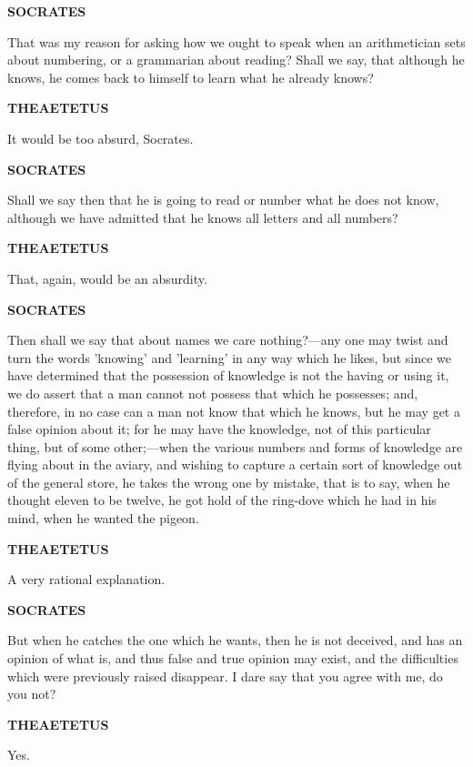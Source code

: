 \documentclass[11pt,letter]{article}
\begin{document}
\par \textbf{SOCRATES}
\par   That was my reason for asking how we ought to speak when an arithmetician sets about numbering, or a grammarian about reading? Shall we say, that although he knows, he comes back to himself to learn what he already knows?

\par \textbf{THEAETETUS}
\par   It would be too absurd, Socrates.

\par \textbf{SOCRATES}
\par   Shall we say then that he is going to read or number what he does not know, although we have admitted that he knows all letters and all numbers?

\par \textbf{THEAETETUS}
\par   That, again, would be an absurdity.

\par \textbf{SOCRATES}
\par   Then shall we say that about names we care nothing?—any one may twist and turn the words 'knowing' and 'learning' in any way which he likes, but since we have determined that the possession of knowledge is not the having or using it, we do assert that a man cannot not possess that which he possesses; and, therefore, in no case can a man not know that which he knows, but he may get a false opinion about it; for he may have the knowledge, not of this particular thing, but of some other;—when the various numbers and forms of knowledge are flying about in the aviary, and wishing to capture a certain sort of knowledge out of the general store, he takes the wrong one by mistake, that is to say, when he thought eleven to be twelve, he got hold of the ring-dove which he had in his mind, when he wanted the pigeon.

\par \textbf{THEAETETUS}
\par   A very rational explanation.

\par \textbf{SOCRATES}
\par   But when he catches the one which he wants, then he is not deceived, and has an opinion of what is, and thus false and true opinion may exist, and the difficulties which were previously raised disappear. I dare say that you agree with me, do you not?

\par \textbf{THEAETETUS}
\par   Yes.
\end{document}
